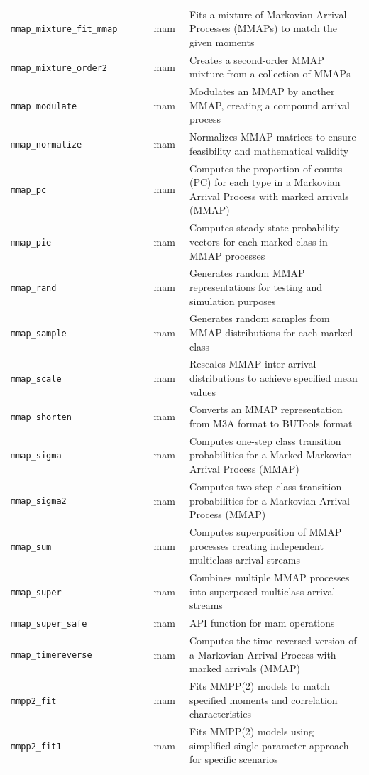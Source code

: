 \begin{footnotesize}
\begin{longtable}{|p{0.4\linewidth}|p{0.1\linewidth}|p{0.5\linewidth}|}
\texttt{mmap\_mixture\_fit\_mmap} & mam & Fits a mixture of Markovian Arrival Processes (MMAPs) to match the given moments\\
\texttt{mmap\_mixture\_order2} & mam & Creates a second-order MMAP mixture from a collection of MMAPs\\
\texttt{mmap\_modulate} & mam & Modulates an MMAP by another MMAP, creating a compound arrival process\\
\texttt{mmap\_normalize} & mam & Normalizes MMAP matrices to ensure feasibility and mathematical validity\\
\texttt{mmap\_pc} & mam & Computes the proportion of counts (PC) for each type in a Markovian Arrival Process with marked arrivals (MMAP)\\
\texttt{mmap\_pie} & mam & Computes steady-state probability vectors for each marked class in MMAP processes\\
\texttt{mmap\_rand} & mam & Generates random MMAP representations for testing and simulation purposes\\
\texttt{mmap\_sample} & mam & Generates random samples from MMAP distributions for each marked class\\
\texttt{mmap\_scale} & mam & Rescales MMAP inter-arrival distributions to achieve specified mean values\\
\texttt{mmap\_shorten} & mam & Converts an MMAP representation from M3A format to BUTools format\\
\texttt{mmap\_sigma} & mam & Computes one-step class transition probabilities for a Marked Markovian Arrival Process (MMAP)\\
\texttt{mmap\_sigma2} & mam & Computes two-step class transition probabilities for a Markovian Arrival Process (MMAP)\\
\texttt{mmap\_sum} & mam & Computes superposition of MMAP processes creating independent multiclass arrival streams\\
\texttt{mmap\_super} & mam & Combines multiple MMAP processes into superposed multiclass arrival streams\\
\texttt{mmap\_super\_safe} & mam & API function for mam operations\\
\texttt{mmap\_timereverse} & mam & Computes the time-reversed version of a Markovian Arrival Process with marked arrivals (MMAP)\\
\texttt{mmpp2\_fit} & mam & Fits MMPP(2) models to match specified moments and correlation characteristics\\
\texttt{mmpp2\_fit1} & mam & Fits MMPP(2) models using simplified single-parameter approach for specific scenarios\\

\end{longtable}
\end{footnotesize}
